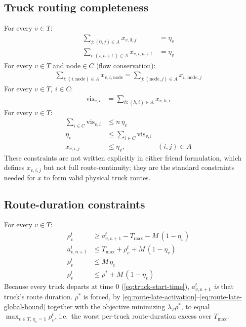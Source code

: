 \documentclass[10pt]{article}
\begin{document}
\subsection{Truck routing completeness}
\label{sec:routing}
For every $v\in T$:
\begin{align}
\sum_{j:(0,j)\in A} x_{v,0,j} &= \eta_v \label{eq:depot-depart}\\
\sum_{i:(i,n+1)\in A} x_{v,i,n+1} &= \eta_v \label{eq:depot-return}
\end{align}
For every $v\in T$ and $\mathrm{node}\in C$ (flow conservation):
\begin{align}
\sum_{i:(i,\mathrm{node})\in A} x_{v,i,\mathrm{node}} = \sum_{j:(\mathrm{node},j)\in A} x_{v,\mathrm{node},j} \label{eq:flow}
\end{align}
For every $v\in T,\ i\in C$:
\begin{align}
\mathrm{vis}_{v,i} &= \sum_{h:(h,i)\in A} x_{v,h,i} \label{eq:visit-def}
\end{align}
For every $v\in T$:
\begin{align}
\sum_{i\in C} \mathrm{vis}_{v,i} &\le n\,\eta_v \label{eq:used-upper}\\
\eta_v &\le \sum_{i\in C} \mathrm{vis}_{v,i} \label{eq:used-lower}\\
x_{v,i,j} &\le \eta_v, & (i,j)\in A \label{eq:arc-activation}
\end{align}
\noindent These constraints are not written explicitly in either friend
formulation, which defines $x_{v,i,j}$ but not full route-continuity; they are
the standard constraints needed for $x$ to form valid physical truck routes.

\subsection{Route-duration constraints}
For every $v\in T$:
\begin{align}
\rho^t_v &\ge a^t_{v,n+1} - T_{\max} - M\,(1-\eta_v) \label{eq:route-late-def}\\
a^t_{v,n+1} &\le T_{\max} + \rho^t_v + M\,(1-\eta_v) \label{eq:route-late-bound}\\
\rho^t_v &\le M\,\eta_v \label{eq:route-late-activation}\\
\rho^t_v &\le \rho^* + M\,(1-\eta_v) \label{eq:route-late-global-bound}
\end{align}
\noindent Because every truck departs at time $0$ (\eqref{eq:truck-start-time}),
$a^t_{v,n+1}$ \emph{is} that truck's route duration. $\rho^*$ is forced, by
\eqref{eq:route-late-activation}--\eqref{eq:route-late-global-bound} together
with the objective minimizing $\lambda_T\rho^*$, to equal $\max_{v\in
T,\,\eta_v=1} \rho^t_v$, i.e.\ the worst per-truck route-duration excess over
$T_{\max}$.
\end{document}
